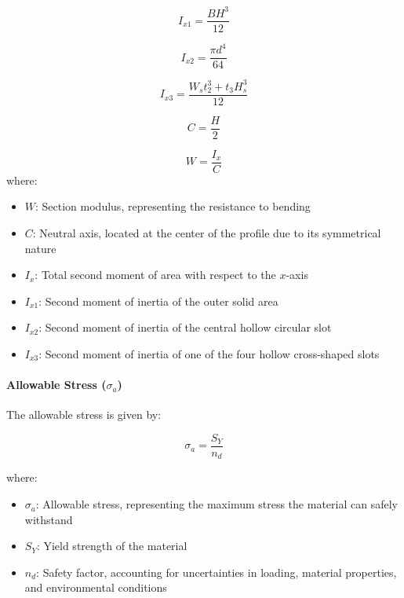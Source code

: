 \documentclass[../../main]{subfiles}
\begin{document}
\begin{equation}
  I_{x1} = \frac{BH^3}{12} 
\end{equation}

\begin{equation}
  I_{x2} = \frac{\pi d^4}{64} 
\end{equation}

\begin{equation}
  I_{x3} = \frac{W_s t_2^3 + t_3 H_s^3}{12} 
\end{equation}

\begin{equation}
  C = \frac{H}{2} 
\end{equation}

\begin{equation}
  W = \frac{I_x}{C} 
\end{equation}
where:

\begin{itemize}
    \item $W$: Section modulus, representing the resistance to bending
    \item $C$: Neutral axis, located at the center of the profile due to its symmetrical nature
    \item $I_x$: Total second moment of area with respect to the $x$-axis
    \item $I_{x1}$: Second moment of inertia of the outer solid area
    \item $I_{x2}$: Second moment of inertia of the central hollow circular slot
    \item $I_{x3}$: Second moment of inertia of one of the four hollow cross-shaped slots
\end{itemize}

\paragraph{Allowable Stress ($\sigma_a$)}
The allowable stress is given by:

\begin{equation}
    \sigma_a = \frac{S_Y}{n_d} \tag{28}
\end{equation}

where:

\begin{itemize}
    \item $\sigma_a$: Allowable stress, representing the maximum stress the material can safely withstand
    \item $S_Y$: Yield strength of the material
    \item $n_d$: Safety factor, accounting for uncertainties in loading, material properties, and environmental conditions
\end{itemize}
\end{document}
